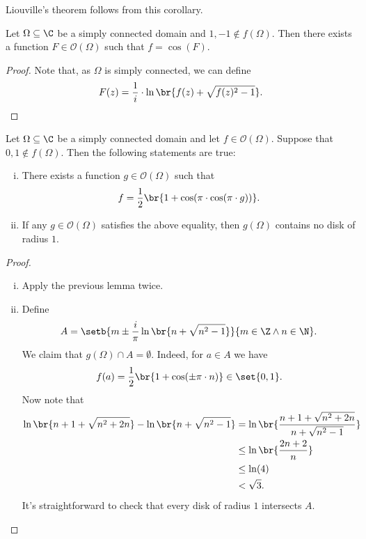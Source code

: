 \begin{opomba}
Liouville's theorem follows from this corollary.
\end{opomba}

\begin{lema}\label{thm_hol:lm:arcos}
Let $\Omega \subseteq \C$ be a simply connected domain and
$1, -1 \not \in f(\Omega)$. Then there exists a function
$F \in \mathcal{O}(\Omega)$ such that $f = \cos(F)$.
\end{lema}

\begin{proof}
Note that, as $\Omega$ is simply connected, we can define
\[
F(z) =
\frac{1}{i} \cdot \ln \br{f(z) + \sqrt{f(z)^2-1}}. \qedhere
\]
\end{proof}

\begin{izrek}
Let $\Omega \subseteq \C$ be a simply connected domain and let
$f \in \mathcal{O}(\Omega)$. Suppose that
$0, 1 \not \in f(\Omega)$. Then the following statements are true:

\begin{enumerate}[i)]
\item There exists a function $g \in \mathcal{O}(\Omega)$ such that
\[
f = \frac{1}{2} \br{1 + \cos(\pi \cdot \cos(\pi \cdot g))}.
\]
\item If any $g \in \mathcal{O}(\Omega)$ satisfies the above
equality, then $g(\Omega)$ contains no disk of radius $1$.
\end{enumerate}
\end{izrek}

\begin{proof}
\phantom{a}
\begin{enumerate}[i)]
\item Apply the previous lemma twice.
\item Define
\[
A =
\setb{m \pm \frac{i}{\pi} \ln \br{n + \sqrt{n^2-1}}}
{m \in \Z \land n \in \N}.
\]
We claim that $g(\Omega) \cap A = \emptyset$. Indeed, for $a \in A$
we have
\[
f(a) = \frac{1}{2} \br{1 + \cos(\pm \pi \cdot n)} \in \set{0,1}.
\]
Now note that
\begin{align*}
\ln \br{n+1 + \sqrt{n^2 + 2n}} - \ln \br{n + \sqrt{n^2-1}} &=
\ln \br{\frac{n+1 + \sqrt{n^2 + 2n}}{n + \sqrt{n^2 - 1}}}
\\
&\leq
\ln \br{\frac{2n + 2}{n}}
\\
&\leq \ln(4)
\\
&<
\sqrt{3}.
\end{align*}
It's straightforward to check that every disk of radius $1$
intersects $A$. \qedhere
\end{enumerate}
\end{proof}

